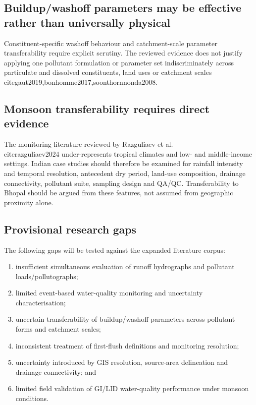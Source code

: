 \documentclass[journal]{IEEEtran}
\begin{document}
\subsection{Buildup/washoff parameters may be effective rather than universally physical}
Constituent-specific washoff behaviour and catchment-scale parameter transferability require explicit scrutiny. The reviewed evidence does not justify applying one pollutant formulation or parameter set indiscriminately across particulate and dissolved constituents, land uses or catchment scales \\cite{gaut2019,bonhomme2017,soonthornnonda2008}.

\subsection{Monsoon transferability requires direct evidence}
The monitoring literature reviewed by Razguliaev et al. \\cite{razguliaev2024} under-represents tropical climates and low- and middle-income settings. Indian case studies should therefore be examined for rainfall intensity and temporal resolution, antecedent dry period, land-use composition, drainage connectivity, pollutant suite, sampling design and QA/QC. Transferability to Bhopal should be argued from these features, not assumed from geographic proximity alone.

\subsection{Provisional research gaps}
The following gaps will be tested against the expanded literature corpus:
\begin{enumerate}[leftmargin=1.5em]
  \item insufficient simultaneous evaluation of runoff hydrographs and pollutant loads/pollutographs;
  \item limited event-based water-quality monitoring and uncertainty characterisation;
  \item uncertain transferability of buildup/washoff parameters across pollutant forms and catchment scales;
  \item inconsistent treatment of first-flush definitions and monitoring resolution;
  \item uncertainty introduced by GIS resolution, source-area delineation and drainage connectivity; and
  \item limited field validation of GI/LID water-quality performance under monsoon conditions.
\end{enumerate}
\end{document}
